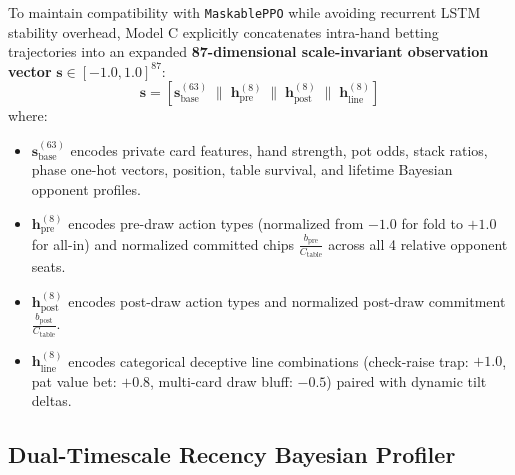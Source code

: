 To maintain compatibility with \texttt{MaskablePPO} while avoiding recurrent LSTM stability overhead, Model C explicitly concatenates intra-hand betting trajectories into an expanded \textbf{87-dimensional scale-invariant observation vector} $\mathbf{s} \in [-1.0, 1.0]^{87}$:
\begin{equation}
    \mathbf{s} = \left[ \mathbf{s}_{\text{base}}^{(63)} \;\|\; \mathbf{h}_{\text{pre}}^{(8)} \;\|\; \mathbf{h}_{\text{post}}^{(8)} \;\|\; \mathbf{h}_{\text{line}}^{(8)} \right]
\end{equation}
where:
\begin{itemize}
    \item $\mathbf{s}_{\text{base}}^{(63)}$ encodes private card features, hand strength, pot odds, stack ratios, phase one-hot vectors, position, table survival, and lifetime Bayesian opponent profiles.
    \item $\mathbf{h}_{\text{pre}}^{(8)}$ encodes pre-draw action types (normalized from $-1.0$ for fold to $+1.0$ for all-in) and normalized committed chips $\frac{b_{\text{pre}}}{C_{\text{table}}}$ across all 4 relative opponent seats.
    \item $\mathbf{h}_{\text{post}}^{(8)}$ encodes post-draw action types and normalized post-draw commitment $\frac{b_{\text{post}}}{C_{\text{table}}}$.
    \item $\mathbf{h}_{\text{line}}^{(8)}$ encodes categorical deceptive line combinations (check-raise trap: $+1.0$, pat value bet: $+0.8$, multi-card draw bluff: $-0.5$) paired with dynamic tilt deltas.
\end{itemize}

\subsection{Dual-Timescale Recency Bayesian Profiler}
\label{subsec:recency}

